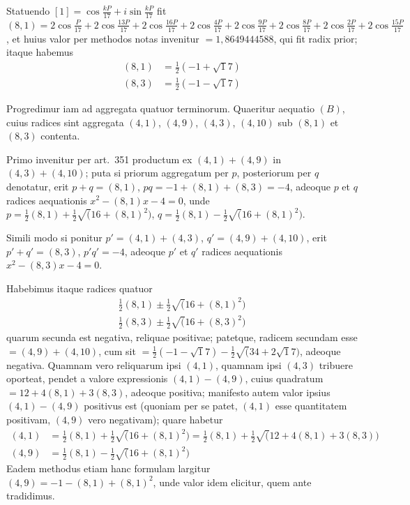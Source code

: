 \documentclass[12pt,a4paper]{article}
\theoremstyle{plain}
\theoremstyle{definition}
\theoremstyle{remark}
\begin{document}
Statuendo $[1]=\cos\frac{kP}{17}+i\sin\frac{kP}{17}$ fit $(8,1)=2\cos\frac{P}{17}+2\cos\frac{13P}{17}+2\cos\frac{16P}{17}+2\cos\frac{4P}{17}+2\cos\frac{9P}{17}+2\cos\frac{8P}{17}+2\cos\frac{2P}{17}+2\cos\frac{15P}{17}$, et huius valor per methodos notas invenitur $=1{,}8649444588$, qui fit radix prior; itaque habemus
\begin{align*}
(8,1)&=\tfrac{1}{2}(-1+\surd 17)\\
(8,3)&=\tfrac{1}{2}(-1-\surd 17)
\end{align*}

Progredimur iam ad aggregata quatuor terminorum. Quaeritur aequatio $(B)$, cuius radices sint aggregata $(4,1)$, $(4,9)$, $(4,3)$, $(4,10)$ sub $(8,1)$ et $(8,3)$ contenta.

Primo invenitur per art.\ 351 productum ex $(4,1)+(4,9)$ in $(4,3)+(4,10)$; puta si priorum aggregatum per $p$, posteriorum per $q$ denotatur, erit $p+q=(8,1)$, $pq=-1+(8,1)+(8,3)=-4$, adeoque $p$ et $q$ radices aequationis $x^2-(8,1)x-4=0$, unde $p=\frac{1}{2}(8,1)+\frac{1}{2}\surd(16+(8,1)^2)$, $q=\frac{1}{2}(8,1)-\frac{1}{2}\surd(16+(8,1)^2)$.

Simili modo si ponitur $p'=(4,1)+(4,3)$, $q'=(4,9)+(4,10)$, erit $p'+q'=(8,3)$, $p'q'=-4$, adeoque $p'$ et $q'$ radices aequationis $x^2-(8,3)x-4=0$.

Habebimus itaque radices quatuor
\begin{align*}
\tfrac{1}{2}(8,1)\pm\tfrac{1}{2}\surd(16+(8,1)^2)\\
\tfrac{1}{2}(8,3)\pm\tfrac{1}{2}\surd(16+(8,3)^2)
\end{align*}
quarum secunda est negativa, reliquae positivae; patetque, radicem secundam esse $=(4,9)+(4,10)$, cum sit $=\frac{1}{2}(-1-\surd 17)-\frac{1}{2}\surd(34+2\surd 17)$, adeoque negativa. Quamnam vero reliquarum ipsi $(4,1)$, quamnam ipsi $(4,3)$ tribuere oporteat, pendet a valore expressionis $(4,1)-(4,9)$, cuius quadratum $=12+4(8,1)+3(8,3)$, adeoque positiva; manifesto autem valor ipsius $(4,1)-(4,9)$ positivus est (quoniam per se patet, $(4,1)$ esse quantitatem positivam, $(4,9)$ vero negativam); quare habetur
\begin{align*}
(4,1)&=\tfrac{1}{2}(8,1)+\tfrac{1}{2}\surd(16+(8,1)^2)=\tfrac{1}{2}(8,1)+\tfrac{1}{2}\surd(12+4(8,1)+3(8,3))\\
(4,9)&=\tfrac{1}{2}(8,1)-\tfrac{1}{2}\surd(16+(8,1)^2)
\end{align*}
Eadem methodus etiam hanc formulam largitur $(4,9)=-1-(8,1)+(8,1)^2$, unde valor idem elicitur, quem ante tradidimus.
\end{document}
